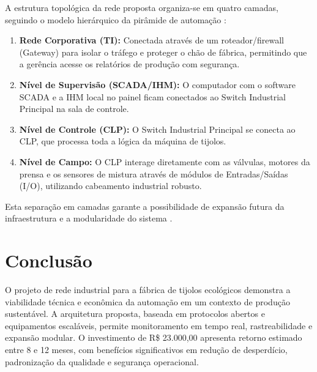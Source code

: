 \documentclass[12pt,a4paper,oneside]{article}
\begin{document}
A estrutura topológica da rede proposta organiza-se em quatro camadas, seguindo o modelo hierárquico da pirâmide de automação \cite{moraes2007}:

\begin{enumerate}
  \item \textbf{Rede Corporativa (TI):} Conectada através de um roteador/firewall (Gateway) para isolar o tráfego e proteger o chão de fábrica, permitindo que a gerência acesse os relatórios de produção com segurança.
  \item \textbf{Nível de Supervisão (SCADA/IHM):} O computador com o software SCADA e a IHM local no painel ficam conectados ao Switch Industrial Principal na sala de controle.
  \item \textbf{Nível de Controle (CLP):} O Switch Industrial Principal se conecta ao CLP, que processa toda a lógica da máquina de tijolos.
  \item \textbf{Nível de Campo:} O CLP interage diretamente com as válvulas, motores da prensa e os sensores de mistura através de módulos de Entradas/Saídas (I/O), utilizando cabeamento industrial robusto.
\end{enumerate}

Esta separação em camadas garante a possibilidade de expansão futura da infraestrutura e a modularidade do sistema \cite{senai2014}.

\section{Conclusão}

O projeto de rede industrial para a fábrica de tijolos ecológicos demonstra a viabilidade técnica e econômica da automação em um contexto de produção sustentável. A arquitetura proposta, baseada em protocolos abertos e equipamentos escaláveis, permite monitoramento em tempo real, rastreabilidade e expansão modular. O investimento de R\$ 23.000,00 apresenta retorno estimado entre 8 e 12 meses, com benefícios significativos em redução de desperdício, padronização da qualidade e segurança operacional.



\end{document}
